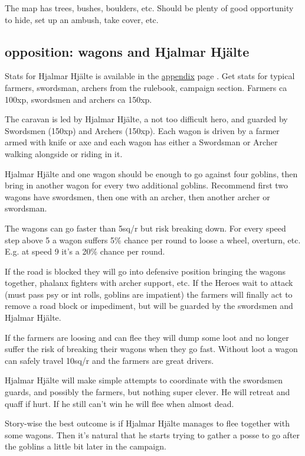 The map has trees, bushes, boulders, etc. Should be plenty of good opportunity to hide, set up an ambush, take cover, etc.


\subsection*{opposition: wagons and Hjalmar Hjälte}

Stats for Hjalmar Hjälte is available in the \hyperref[hjalmarhjalte]{appendix} page \pageref{hjalmarhjalte}. Get stats for typical farmers, swordsman, archers from the rulebook, campaign section. Farmers ca 100xp, swordsmen and archers ca 150xp.

The caravan is led by Hjalmar Hjälte, a not too difficult hero, and guarded by Swordsmen (150xp) and Archers (150xp). Each wagon is driven by a farmer armed with knife or axe and each wagon has either a Swordsman or Archer walking alongside or riding in it.

Hjalmar Hjälte and one wagon should be enough to go against four goblins, then bring in another wagon for every two additional goblins. Recommend first two wagons have swordsmen, then one with an archer, then another archer or swordsman.

The wagons can go faster than 5sq/r but risk breaking down. For every speed step above 5 a wagon suffers 5\% chance per round to loose a wheel, overturn, etc. E.g. at speed 9 it's a 20\% chance per round.

If the road is blocked they will go into defensive position bringing the wagons together, phalanx fighters with archer support, etc. If the Heroes wait to attack (must pass psy or int rolls, goblins are impatient) the farmers will finally act to remove a road block or impediment, but will be guarded by the swordsmen and Hjalmar Hjälte.

If the farmers are loosing and can flee they will dump some loot and no longer suffer the risk of breaking their wagons when they go fast. Without loot a wagon can safely travel 10sq/r and the farmers are great drivers.

Hjalmar Hjälte will make simple attempts to coordinate with the swordsmen guards, and possibly the farmers, but nothing super clever. He will retreat and quaff if hurt. If he still can't win he will flee when almost dead.

Story-wise the best outcome is if Hjalmar Hjälte manages to flee together with some wagons. Then it's natural that he starts trying to gather a posse to go after the goblins a little bit later in the campaign.


